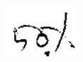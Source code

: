 \documentclass[10pt]{article}
\begin{document}
\includegraphics[max width=\textwidth]{2022_11_11_a5e8a54031fc138b833ag-1(4)}
\end{document}
